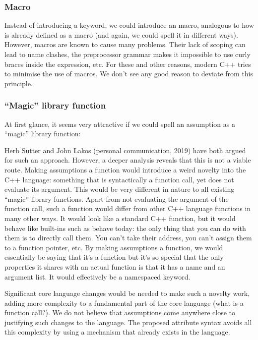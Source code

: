 \subsubsection{Macro}

Instead of introducing a keyword, we could introduce an  macro, analogous to how  is already defined as a macro (and again, we could spell it in different ways). However, macros are known to cause many problems. Their lack of scoping can lead to name clashes, the preprocessor grammar makes it impossible to use curly braces inside the expression, etc. For these and other reasons, modern C++ tries to minimise the use of macros. We don't see any good reason to deviate from this principle.

\subsubsection{``Magic'' library function}

At first glance, it seems very attractive if we could spell an assumption as a ``magic'' library function:

\forceindent
 
Herb Sutter \cite{P2064R0} and John Lakos (personal communication, 2019) have both argued for such an approach. However, a deeper analysis reveals that this is not a viable route. Making assumptions a function would introduce a weird novelty into the C++ language: something that is syntactically a function call, yet does not evaluate its argument. This would be very different in nature to all existing ``magic'' library functions. Apart from not evaluating the argument of the function call, such a function would differ from other C++ language functions in many other ways. It would look like a standard C++ function, but it would behave like built-ins such as  behave today: the only thing that you can do with them is to directly call them. You can't take their address, you can’t assign them to a function pointer, etc. By making assumptions a function, we would essentially be saying that it's a function but it's so special that the only properties it shares with an actual function is that it has a name and an argument list. It would effectively be a namespaced keyword.

Significant core language changes would be needed to make such a novelty work, adding more complexity to a fundamental part of the core language (what is a function call?). We do not believe that assumptions come anywhere close to justifying such changes to the language. The proposed attribute syntax avoids all this complexity by using a mechanism that already exists in the language.

